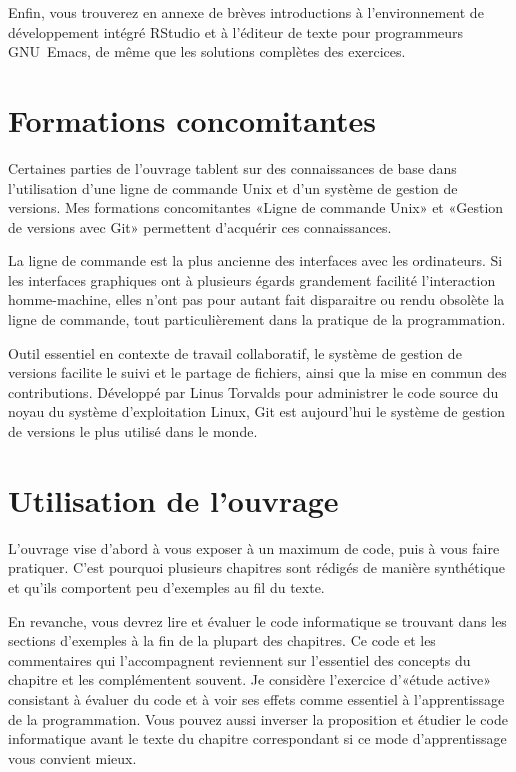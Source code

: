 Enfin, vous trouverez en annexe de brèves introductions à
l'environnement de développement intégré RStudio et à l'éditeur de
texte pour programmeurs GNU~Emacs, de même que les solutions complètes
des exercices.

\section*{Formations concomitantes}

Certaines parties de l'ouvrage tablent sur des connaissances de base
dans l'utilisation d'une ligne de commande Unix et d'un système de
gestion de versions. Mes formations concomitantes «Ligne de commande
Unix» \citep{Goulet:laboratoire-cli:2022} et «Gestion de versions avec
Git» \citep{Goulet:laboratoire-git:2023} permettent d'acquérir ces
connaissances.

La ligne de commande est la plus ancienne des interfaces avec les
ordinateurs. Si les interfaces graphiques ont à plusieurs égards
grandement facilité l'interaction homme-machine, elles n'ont pas pour
autant fait disparaitre ou rendu obsolète la ligne de commande, tout
particulièrement dans la pratique de la programmation.

Outil essentiel en contexte de travail collaboratif, le système de
gestion de versions facilite le suivi et le partage de fichiers, ainsi
que la mise en commun des contributions. Développé par Linus Torvalds
pour administrer le code source du noyau du système d'exploitation
Linux, Git est aujourd'hui le système de gestion de
versions le plus utilisé dans le monde.


\section*{Utilisation de l'ouvrage}

L'ouvrage vise d'abord à vous exposer à un maximum de code, puis à
vous faire pratiquer. C'est pourquoi plusieurs chapitres sont rédigés
de manière synthétique et qu'ils comportent peu d'exemples au fil du
texte.

En revanche, vous devrez lire et évaluer le code informatique se
trouvant dans les sections d'exemples à la fin de la plupart des
chapitres. Ce code et les commentaires qui l'accompagnent reviennent
sur l'essentiel des concepts du chapitre et les complémentent souvent.
Je considère l'exercice d'«étude active» consistant à évaluer du code
et à voir ses effets comme essentiel à l'apprentissage de la
programmation. Vous pouvez aussi inverser la proposition et étudier le
code informatique avant le texte du chapitre correspondant si ce mode
d'apprentissage vous convient mieux.

